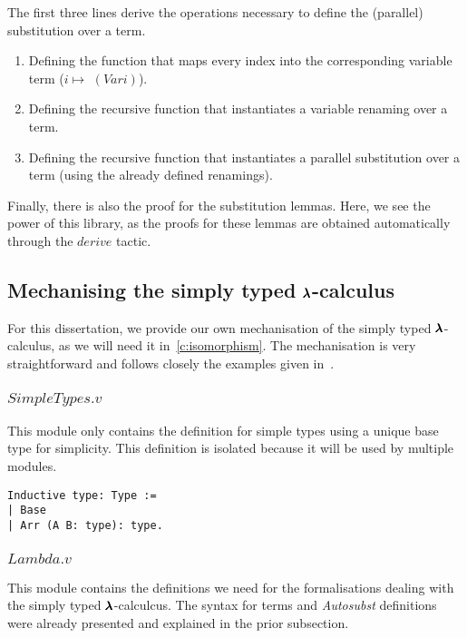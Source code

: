 The first three lines derive the operations necessary to define the (parallel) substitution over a term.
\begin{enumerate}
\item Defining the function that maps every index into the corresponding variable term ($i \mapsto $ \lst$(Var i)$).
\item Defining the recursive function that instantiates a variable renaming over a term.
\item Defining the recursive function that instantiates a parallel substitution over a term (using the already defined renamings).
\end{enumerate}

Finally, there is also the proof for the substitution lemmas.
Here, we see the power of this library, as the proofs for these lemmas are obtained automatically through the \lst$derive$ tactic. 


\subsection{Mechanising the simply typed $\pmb{\lambda}$-calculus}

For this dissertation, we provide our own mechanisation of the simply typed $\pmb{\lambda}$-calculus, as we will need it in~\cref{c:isomorphism}.
The mechanisation is very straightforward and follows closely the examples given in~\cite{AutosubstManual,AutosubstSchafer}.

\subsubsection{\lst$SimpleTypes.v$}

This module only contains the definition for simple types using a unique base type for simplicity.
This definition is isolated because it will be used by multiple modules.
\begin{lstlisting}[language=Coq]
Inductive type: Type :=
| Base
| Arr (A B: type): type.
\end{lstlisting}

\subsubsection{\lst$Lambda.v$}

This module contains the definitions we need for the formalisations dealing with the simply typed $\pmb{\lambda}$-calculcus.
The syntax for terms and \textit{Autosubst} definitions were already presented and explained in the prior subsection.

